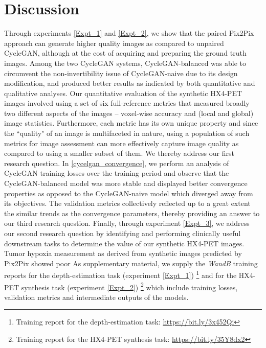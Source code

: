 \chapter{Discussion}
\label{Discussion}

Through experiments \ref{Expt_1} and \ref{Expt_2}, we show that the paired Pix2Pix approach can generate higher quality images as compared to unpaired CycleGAN, although at the cost of acquiring and preparing the ground truth images. Among the two CycleGAN systems, CycleGAN-balanced was able to circumvent the non-invertibility issue of CycleGAN-naive due to its design modification, and produced better results as indicated by both quantitative and qualitative analyses. Our quantitative evaluation of the synthetic HX4-PET images involved using a set of six full-reference metrics that measured broadly two different aspects of the images -- voxel-wise accuracy and (local and global) image statistics. Furthermore, each metric has its own unique property and since the ``quality" of an image is multifaceted in nature, using a population of such metrics for image assessment can more effectively capture image quality as compared to using a smaller subset of them. We thereby address our first research question. In \ref{cycelgan_convergence}, we perform an analysis of CycleGAN training losses over the training period and observe that the CycleGAN-balanced model was more stable and displayed better convergence properties as opposed to the CycleGAN-naive model which diverged away from its objectives. The validation metrics collectively reflected up to a great extent the similar trends as the convergence parameters, thereby providing an answer to our third research question. Finally, through experiment \ref{Expt_3}, we address our second research question by identifying and performing clinically useful downstream tasks to determine the value of our synthetic HX4-PET images. Tumor hypoxia measurement as derived from synthetic images predicted by Pix2Pix showed poor 
As supplementary material, we supply the \textit{WandB} training reports for the depth-estimation task (experiment \ref{Expt_1}) \footnote{Training report for the depth-estimation task: \url{https://bit.ly/3x452Qi}} and for the HX4-PET synthesis task (experiment \ref{Expt_2}) \footnote{Training report for the HX4-PET synthesis task: \url{https://bit.ly/35Y8dx2}} which include training losses, validation metrics and intermediate outputs of the models.


